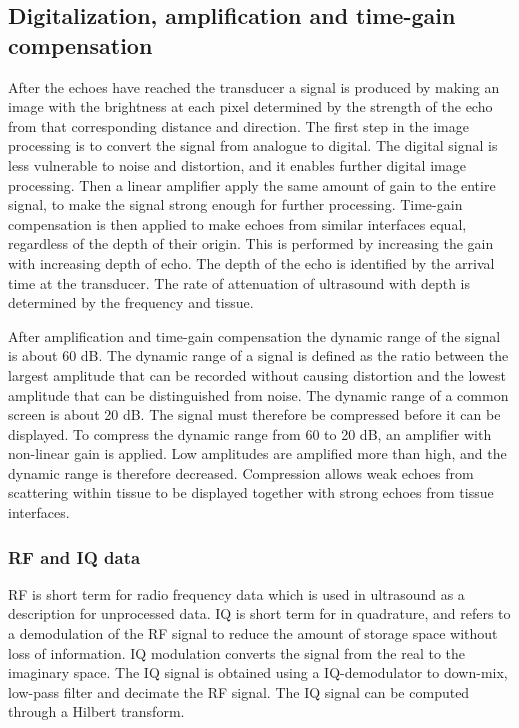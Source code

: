 \subsection{Digitalization, amplification and time-gain compensation}
After the echoes have reached the transducer a signal is produced by making an image with the brightness at each pixel determined by the strength of the echo from that corresponding distance and direction. The first step in the image processing is to convert the signal from analogue to digital. The digital signal is less vulnerable to noise and distortion, and it enables further digital image processing. Then a linear amplifier apply the same amount of gain to the entire signal, to make the signal strong enough for further processing. Time-gain compensation is then applied to make echoes from similar interfaces equal, regardless of the depth of their origin. This is performed by increasing the gain with increasing depth of echo. The depth of the echo is identified by the arrival time at the transducer. The rate of attenuation of ultrasound with depth is determined by the frequency and tissue.

After amplification and time-gain compensation the dynamic range of the signal is about 60 dB. The dynamic range of a signal is defined as the ratio between the largest amplitude that can be recorded without causing distortion and the lowest amplitude that can be distinguished from noise. The dynamic range of a common screen is about 20 dB. The signal must therefore be compressed before it can be displayed. To compress the dynamic range from 60 to 20 dB, an amplifier with non-linear gain is applied. Low amplitudes are amplified more than high, and the dynamic range is therefore decreased. Compression allows weak echoes from scattering within tissue to be displayed together with strong echoes from tissue interfaces.

\subsubsection{RF and IQ data}
RF is short term for radio frequency data which is used in ultrasound as a description for unprocessed data. IQ is short term for in quadrature, and refers to a demodulation of the RF signal to reduce the amount of storage space without loss of information. IQ modulation converts the signal from the real to the imaginary space. The IQ signal is obtained using a IQ-demodulator to down-mix, low-pass filter and decimate the RF signal. The IQ signal can be computed through a Hilbert transform\cite{Kirkhorn1999}.

